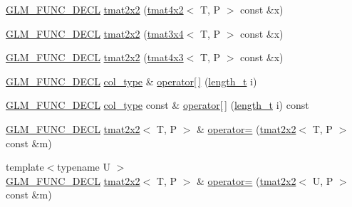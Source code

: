 \begin{DoxyCompactItemize}
\item 
\hyperlink{setup_8hpp_ab2d052de21a70539923e9bcbf6e83a51}{G\+L\+M\+\_\+\+F\+U\+N\+C\+\_\+\+D\+E\+CL} \hyperlink{structglm_1_1detail_1_1tmat2x2_a124fb38aa5a54a8c912e5612b69aabd8}{tmat2x2} (\hyperlink{structglm_1_1detail_1_1tmat4x2}{tmat4x2}$<$ T, P $>$ const \&x)
\item 
\hyperlink{setup_8hpp_ab2d052de21a70539923e9bcbf6e83a51}{G\+L\+M\+\_\+\+F\+U\+N\+C\+\_\+\+D\+E\+CL} \hyperlink{structglm_1_1detail_1_1tmat2x2_a197a18fc9c265eb65da1bc0df80224cf}{tmat2x2} (\hyperlink{structglm_1_1detail_1_1tmat3x4}{tmat3x4}$<$ T, P $>$ const \&x)
\item 
\hyperlink{setup_8hpp_ab2d052de21a70539923e9bcbf6e83a51}{G\+L\+M\+\_\+\+F\+U\+N\+C\+\_\+\+D\+E\+CL} \hyperlink{structglm_1_1detail_1_1tmat2x2_ad9dc3f0b215226f11ba9214e456f69ec}{tmat2x2} (\hyperlink{structglm_1_1detail_1_1tmat4x3}{tmat4x3}$<$ T, P $>$ const \&x)
\item 
\hyperlink{setup_8hpp_ab2d052de21a70539923e9bcbf6e83a51}{G\+L\+M\+\_\+\+F\+U\+N\+C\+\_\+\+D\+E\+CL} \hyperlink{structglm_1_1detail_1_1tmat2x2_ae8c6de6197aa1b65adf15c40197c04d1}{col\+\_\+type} \& \hyperlink{structglm_1_1detail_1_1tmat2x2_a3eccfee40595e7b8023755e5d41ed0fe}{operator\mbox{[}$\,$\mbox{]}} (\hyperlink{namespaceglm_a090a0de2260835bee80e71a702492ed9}{length\+\_\+t} i)
\item 
\hyperlink{setup_8hpp_ab2d052de21a70539923e9bcbf6e83a51}{G\+L\+M\+\_\+\+F\+U\+N\+C\+\_\+\+D\+E\+CL} \hyperlink{structglm_1_1detail_1_1tmat2x2_ae8c6de6197aa1b65adf15c40197c04d1}{col\+\_\+type} const  \& \hyperlink{structglm_1_1detail_1_1tmat2x2_a3a9f2dd9b3a591b9aaad08aee8071c70}{operator\mbox{[}$\,$\mbox{]}} (\hyperlink{namespaceglm_a090a0de2260835bee80e71a702492ed9}{length\+\_\+t} i) const
\item 
\hyperlink{setup_8hpp_ab2d052de21a70539923e9bcbf6e83a51}{G\+L\+M\+\_\+\+F\+U\+N\+C\+\_\+\+D\+E\+CL} \hyperlink{structglm_1_1detail_1_1tmat2x2}{tmat2x2}$<$ T, P $>$ \& \hyperlink{structglm_1_1detail_1_1tmat2x2_a614355976a61bf79d7e7ab0e445cd954}{operator=} (\hyperlink{structglm_1_1detail_1_1tmat2x2}{tmat2x2}$<$ T, P $>$ const \&m)
\item 
{\footnotesize template$<$typename U $>$ }\\\hyperlink{setup_8hpp_ab2d052de21a70539923e9bcbf6e83a51}{G\+L\+M\+\_\+\+F\+U\+N\+C\+\_\+\+D\+E\+CL} \hyperlink{structglm_1_1detail_1_1tmat2x2}{tmat2x2}$<$ T, P $>$ \& \hyperlink{structglm_1_1detail_1_1tmat2x2_a7057eb615bb4f04105d614256cdf5ed6}{operator=} (\hyperlink{structglm_1_1detail_1_1tmat2x2}{tmat2x2}$<$ U, P $>$ const \&m)

\end{DoxyCompactItemize}
